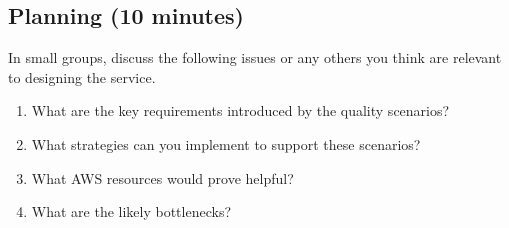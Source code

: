 \documentclass{csse4400}
\begin{document}
\subsection*{Planning (10 minutes)}
In small groups, discuss the following issues or any others you think are relevant to designing the service.

\begin{enumerate}
    \item What are the key requirements introduced by the quality scenarios?
    \item What strategies can you implement to support these scenarios?
    \item What AWS resources would prove helpful?
    \item What are the likely bottlenecks?
\end{enumerate}
\end{document}
